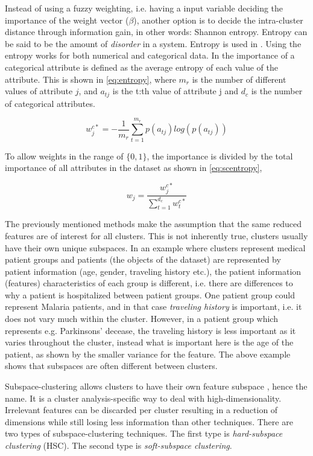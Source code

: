 \documentclass[../report.tex]{subfiles}
\begin{document}
Instead of using a fuzzy weighting, i.e. having a input variable deciding the importance of the weight vector ($\beta$), another option is to decide the intra-cluster distance through information gain, in other words: Shannon entropy. Entropy can be said to be the amount of \textit{disorder} in a system. Entropy is used in \cite{Cheung2013, Jing2007}. Using the entropy works for both numerical and categorical data. In \cite{Cheung2013} the importance of a categorical attribute is defined as the average entropy of each value of the attribute. This is shown in \cref{eq:entropy}, where ${m_r}$ is the number of different values of attribute $j$, and $a_{tj}$ is the t:th value of attribute j and $d_c$ is the number of categorical attributes.

\begin{equation}
  w_j^{c*} =  - \frac{1}{m_r} \sum^{m_r}_{t = 1}{p(a_{tj}) log(p(a_{tj}))}
\label{eq:entropy}
\end{equation}

To allow weights in the range of $\{0,1\}$, the importance is divided by the total importance of all attributes in the dataset as shown in \cref{eq:scentropy}, 


\begin{equation}
  w_j = \frac{w_j^{c*}}{\sum_{t = 1}^{d_c}{w_t^{c*}}}
  \label{eq:scentropy}
\end{equation}

The previously mentioned methods make the assumption that the same reduced features are of interest for all clusters. This is not inherently true, clusters usually have their own unique subspaces. In an example where clusters represent medical patient groups and patients (the objects of the dataset) are represented by patient information (age, gender, traveling history etc.), the patient information (features) characteristics of each group is different, i.e. there are differences to why a patient is hospitalized between patient groups. One patient group could represent Malaria patients, and in that case \textit{traveling history} is important, i.e. it does not vary much within the cluster. However, in a patient group which represents e.g. Parkinsons' decease, the traveling history is less important as it varies throughout the cluster, instead what is important here is the age of the patient, as shown by the smaller variance for the feature. The above example shows that subspaces are often different between clusters.

Subspace-clustering allows clusters to have their own feature subspace \cite{Deng2016, Jing2007, Jia2018, Kriegler2012}, hence the name. It is a cluster analysis-specific way to deal with high-dimensionality. Irrelevant features can be discarded per cluster resulting in a reduction of dimensions while still losing less information than other techniques. There are two types of subspace-clustering techniques. The first type is \textit{hard-subspace clustering} (HSC). The second type is \textit{soft-subspace clustering}.
\end{document}
